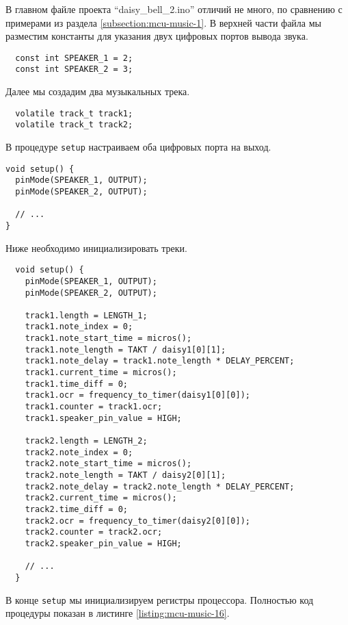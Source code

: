 \documentclass[../sparc.tex]{subfiles}
\begin{document}
В главном файле проекта ``daisy\_bell\_2.ino'' отличий не много, по сравнению с
примерами из раздела \ref{subsection:mcu-music-1}.  В верхней части файла мы
разместим константы для указания двух цифровых портов вывода звука.

\begin{verbatim}
  const int SPEAKER_1 = 2;
  const int SPEAKER_2 = 3;
\end{verbatim}

Далее мы создадим два музыкальных трека.

\begin{verbatim}
  volatile track_t track1;
  volatile track_t track2;
\end{verbatim}

В процедуре \texttt{setup} настраиваем оба цифровых порта на выход.

\begin{verbatim}
void setup() {
  pinMode(SPEAKER_1, OUTPUT);
  pinMode(SPEAKER_2, OUTPUT);

  // ...
}
\end{verbatim}

Ниже необходимо инициализировать треки.

\begin{verbatim}
  void setup() {
    pinMode(SPEAKER_1, OUTPUT);
    pinMode(SPEAKER_2, OUTPUT);

    track1.length = LENGTH_1;
    track1.note_index = 0;
    track1.note_start_time = micros();
    track1.note_length = TAKT / daisy1[0][1];
    track1.note_delay = track1.note_length * DELAY_PERCENT;
    track1.current_time = micros();
    track1.time_diff = 0;
    track1.ocr = frequency_to_timer(daisy1[0][0]);
    track1.counter = track1.ocr;
    track1.speaker_pin_value = HIGH;

    track2.length = LENGTH_2;
    track2.note_index = 0;
    track2.note_start_time = micros();
    track2.note_length = TAKT / daisy2[0][1];
    track2.note_delay = track2.note_length * DELAY_PERCENT;
    track2.current_time = micros();
    track2.time_diff = 0;
    track2.ocr = frequency_to_timer(daisy2[0][0]);
    track2.counter = track2.ocr;
    track2.speaker_pin_value = HIGH;

    // ...
  }
\end{verbatim}

\newpage
В конце \texttt{setup} мы инициализируем регистры процессора.
Полностью код процедуры показан в листинге \ref{listing:mcu-music-16}.
\end{document}
